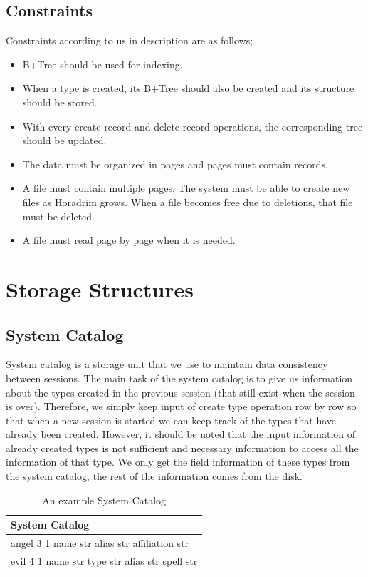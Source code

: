 \documentclass{article}
\begin{document}
\subsection{Constraints}
Constraints according to us in description are as follows;
\begin{itemize}
    \item B+Tree should be used for indexing.
    \item When a type is created, its B+Tree should also be created and its structure should be stored.
    \item With every create record and delete record operations, the corresponding tree should be updated.
    \item The data must be organized in pages and pages must contain records.
    \item A file must contain multiple pages. The system must be able to create new files as Horadrim grows. When a file becomes free due to deletions, that file must be deleted.
    \item A file must read page by page when it is needed.
\end{itemize}

\section{Storage Structures}
\label{sec:structures}
\subsection{System Catalog}
\label{systemcatalog}
System catalog is a storage unit that we use to maintain data consistency between sessions. The main task of the system catalog is to give us information about the types created in the previous session (that still exist when the session is over). Therefore, we simply keep input of create type operation row by row so that when a new session is started we can keep track of the types that have already been created. However, it should be noted that the input information of already created types is not sufficient and necessary information to access all the information of that type. We only get the field information of these types from the system catalog, the rest of the information comes from the disk.



\begin{table}[H]
\centering
\begin{tabular}{|l|}
\hline
\textbf{\hspace{1.6cm} System Catalog} \\
\hline
 {angel 3 1 name str alias str affiliation str} \\
 {evil 4 1 name str type str alias str spell str} \\
\hline
\end{tabular}
\label{tab:ex}
\caption{An example System Catalog}
\end{table}
\end{document}
